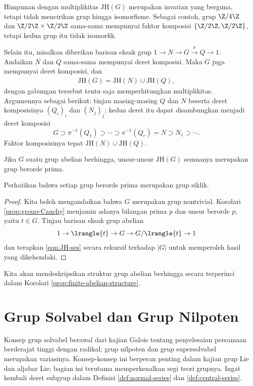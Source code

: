 Himpunan dengan multiplikitas $\text{JH}(G)$ merupakan invarian yang berguna, tetapi tidak mencirikan grup hingga isomorfisme. Sebagai contoh, grup $\Z/4\Z$ dan $\Z/2\Z \times \Z/2\Z$ sama-sama mempunyai faktor komposisi $\{ \Z/2\Z, \Z/2\Z\}$, tetapi kedua grup itu tidak isomorfik.

Selain itu, misalkan diberikan barisan eksak grup $1 \to N \to G \xrightarrow{\pi} Q \to 1$. Andaikan $N$ dan $Q$ sama-sama mempunyai deret komposisi. Maka $G$ juga mempunyai deret komposisi, dan
\begin{gather}\label{eqn:JH-ses}
	\text{JH}(G) = \text{JH}(N) \cup  \text{JH}(Q),
\end{gather}
dengan gabungan tersebut tentu saja memperhitungkan multiplikitas. Argumennya sebagai berikut: tinjau masing-masing $Q$ dan $N$ beserta deret komposisinya $(Q_i)_i$ dan $(N_j)_j$; kedua deret itu dapat disambungkan menjadi deret komposisi
\[ G \supset \pi^{-1}(Q_1) \supset \cdots \supset \pi^{-1}(Q_r) = N \supset N_1 \supset \cdots . \]
Faktor komposisinya tepat $\text{JH}(N) \cup  \text{JH}(Q)$.

\begin{proposition}\label{prop:abelian-composition-series}
	Jika $G$ suatu grup abelian berhingga, unsur-unsur $\text{JH}(G)$ semuanya merupakan grup berorde prima.
\end{proposition}
Perhatikan bahwa setiap grup berorde prima merupakan grup siklik.
\begin{proof}
	Kita boleh mengandaikan bahwa $G$ merupakan grup nontrivial. Korolari \ref{prop:group-Cauchy} menjamin adanya bilangan prima $p$ dan unsur berorde $p$, yaitu $t \in G$. Tinjau barisan eksak grup abelian
	\[ 1 \to \lrangle{t} \to G \to G/\lrangle{t} \to 1 \]
	dan terapkan \eqref{eqn:JH-ses} secara rekursif terhadap $|G|$ untuk memperoleh hasil yang dikehendaki.
\end{proof}

Kita akan mendeskripsikan struktur grup abelian berhingga secara terperinci dalam Korolari \ref{prop:finite-abelian-structure}.
\section{Grup Solvabel dan Grup Nilpoten}\label{sec:solvable-groups}
Konsep grup solvabel berawal dari kajian Galois tentang penyelesaian persamaan berderajat tinggi dengan radikal; grup nilpoten dan grup supersolvabel merupakan variasinya. Konsep-konsep ini berperan penting dalam kajian grup Lie dan aljabar Lie; bagian ini terutama memperkenalkan segi teori grupnya. Ingat kembali deret subgrup dalam Definisi \ref{def:normal-series} dan \ref{def:central-series}.

